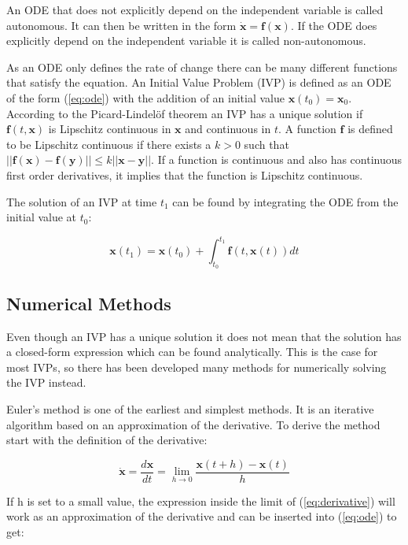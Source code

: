 \documentclass[12pt,a4paper]{book}
\begin{document}
An ODE that does not explicitly depend on the independent variable is called autonomous. It can then be written in the form $\dot{\bm{x}} = \bm{f}(\bm{x})$. If the ODE does explicitly depend on the independent variable it is called non-autonomous.

As an ODE only defines the rate of change there can be many different functions that satisfy the equation. An Initial Value Problem (IVP) is defined as an ODE of the form (\ref{eq:ode}) with the addition of an initial value $\bm{x}(t_0) = \bm{x}_0$. According to the Picard-Lindelöf theorem \citep{kreyszigfunctional} an IVP has a unique solution if $\bm{f}(t, \bm{x})$ is Lipschitz continuous in $\bm{x}$ and continuous in $t$. A function $\bm{f}$ is defined to be Lipschitz continuous if there exists a  $k>0$ such that $||\bm{f}(\bm{x}) - \bm{f}(\bm{y})|| \leq k ||\bm{x} - \bm{y}||$. If a function is continuous and also has continuous first order derivatives, it implies that the function is Lipschitz continuous.

The solution of an IVP at time $t_1$ can be found by integrating the ODE from the initial value at $t_0$:

\begin{equation}
    \bm{x}(t_1) = \bm{x}(t_0) + \int_{t_0}^{t_1} \bm{f}(t, \bm{x}(t)) dt
    \label{eq:ode_solution}
\end{equation}

\subsection{Numerical Methods}
\label{sec:numericalmethods}

Even though an IVP has a unique solution it does not mean that the solution has a closed-form expression which can be found analytically. This is the case for most IVPs, so there has been developed many methods for numerically solving the IVP instead.

Euler's method is one of the earliest and simplest methods. It is an iterative algorithm based on an approximation of the derivative. To derive the method start with the definition of the derivative:

\begin{equation}
    \dot{\bm{x}} = \frac{d \bm{x}}{d t} = \lim_{h \rightarrow 0} \frac{\bm{x}(t + h) - \bm{x}(t)}{h}
    \label{eq:derivative}
\end{equation}

If h is set to a small value, the expression inside the limit of (\ref{eq:derivative}) will work as an approximation of the derivative and can be inserted into (\ref{eq:ode}) to get:
\end{document}
